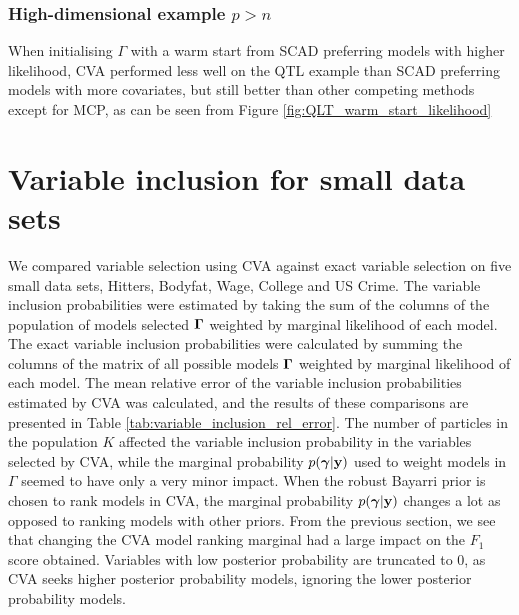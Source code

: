 \documentclass{amsart}[12pt]
\begin{document}
\subsubsection{High-dimensional example $p > n$}
When initialising $\Gamma$ with a warm start from SCAD preferring models with higher likelihood,
CVA performed less well on the QTL example than SCAD preferring models with more covariates, but still
better than other competing methods except for MCP,
as can be seen from Figure \ref{fig:QLT_warm_start_likelihood}

\section{Variable inclusion for small data sets}

We compared variable selection using CVA against exact variable selection on five small data sets,
Hitters, Bodyfat, Wage, College and US Crime. 
The variable inclusion probabilities were estimated by taking the sum of the columns of the population
of models selected ${\boldsymbol \Gamma}$
weighted by marginal likelihood of each model.
The exact variable inclusion probabilities were calculated by summing the columns of the matrix of all possible
models ${\boldsymbol \Gamma}$ weighted by marginal likelihood of each model.
The mean relative error of the variable inclusion probabilities estimated by CVA was calculated,
and the results of these comparisons are presented in Table \ref{tab:variable_inclusion_rel_error}.
The number of particles in the population $K$ affected the
variable inclusion probability in the variables selected by CVA, while the marginal probability
$p({\boldsymbol \gamma} | {\bf y})$ used to weight models in $\Gamma$ seemed to have only a very minor impact.
When the robust Bayarri prior is chosen to rank models in CVA,
the marginal probability $p({\boldsymbol \gamma} | {\bf y})$ changes a lot as opposed to ranking models with other priors.
From the previous section, we see that changing the CVA model ranking
marginal had a large impact on the $F_1$ score obtained.
Variables with low posterior probability are truncated to 0, as CVA seeks higher posterior probability models,
ignoring the lower posterior probability models.
\end{document}
